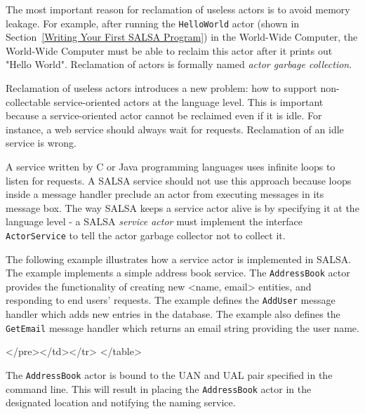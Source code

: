 The most important reason for reclamation of useless actors is to avoid 
memory leakage. For example, after running the {\tt HelloWorld} actor 
(shown in Section~\ref{Writing Your First SALSA Program}) in 
the World-Wide Computer, the World-Wide 
Computer must be able to reclaim this actor after it prints out "Hello World". 
Reclamation of actors is formally named \textit{actor garbage collection}.

Reclamation of useless actors introduces a new problem: how to support 
non-collectable service-oriented actors at the language level. This is important 
because a service-oriented actor cannot be reclaimed even if it is idle. For 
instance, a web service should always wait for requests. Reclamation of an idle 
service is wrong.

A service written by C or Java programming languages uses infinite loops to listen for
requests. 
A SALSA service should not use this approach because loops inside a message handler preclude an actor
from executing messages in its message box. The way SALSA keeps a service actor alive is by 
specifying it at the language level - a SALSA \textit{service actor} must implement the 
interface {\tt ActorService} to 
tell the actor garbage collector not to collect it.

The following example illustrates how a service actor is implemented 
 in SALSA. The example implements a 
simple address book service. The {\tt AddressBook} actor provides the functionality 
of creating new {\textless}name, email{\textgreater} entities, and 
responding to end users' requests. The example defines the {\tt AddUser} 
message handler which adds new entries 
in the database.  The example also defines the {\tt GetEmail} message handler
which returns an email string providing the user name.
{\singlespace

}
\begin{htmlonly}

 \begin{rawhtml} 
   </pre></td></tr>
  </table>
\end{rawhtml} 
\end{htmlonly}
 
The {\tt AddressBook} actor is bound to the UAN and UAL pair specified in the command line. 
This will result in placing the {\tt AddressBook} actor in the designated 
location and notifying the naming service.

